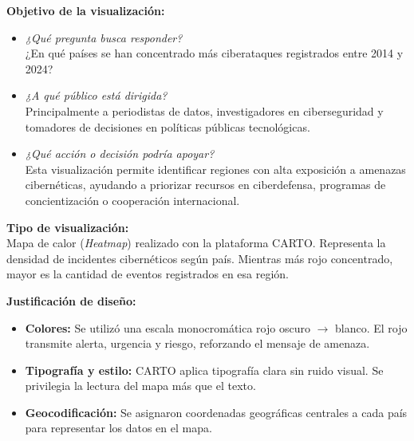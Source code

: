 \documentclass[12pt, a4paper]{article}
\begin{document}
\vspace{0.5em}
\textbf{Objetivo de la visualización:} \\
\begin{itemize}
    \item \textit{¿Qué pregunta busca responder?} \\
    ¿En qué países se han concentrado más ciberataques registrados entre 2014 y 2024?
    
    \item \textit{¿A qué público está dirigida?} \\
    Principalmente a periodistas de datos, investigadores en ciberseguridad y tomadores de decisiones en políticas públicas tecnológicas.

    \item \textit{¿Qué acción o decisión podría apoyar?} \\
    Esta visualización permite identificar regiones con alta exposición a amenazas cibernéticas, ayudando a priorizar recursos en ciberdefensa, programas de concientización o cooperación internacional.
\end{itemize}

\vspace{0.5em}
\textbf{Tipo de visualización:} \\
Mapa de calor (\textit{Heatmap}) realizado con la plataforma CARTO. Representa la densidad de incidentes cibernéticos según país. Mientras más rojo concentrado, mayor es la cantidad de eventos registrados en esa región.

\vspace{0.5em}
\textbf{Justificación de diseño:} \\
\begin{itemize}
    \item \textbf{Colores:} Se utilizó una escala monocromática rojo oscuro $\rightarrow$ blanco. El rojo transmite alerta, urgencia y riesgo, reforzando el mensaje de amenaza.
    \item \textbf{Tipografía y estilo:} CARTO aplica tipografía clara sin ruido visual. Se privilegia la lectura del mapa más que el texto.
    \item \textbf{Geocodificación:} Se asignaron coordenadas geográficas centrales a cada país para representar los datos en el mapa.
\end{itemize}
\end{document}
